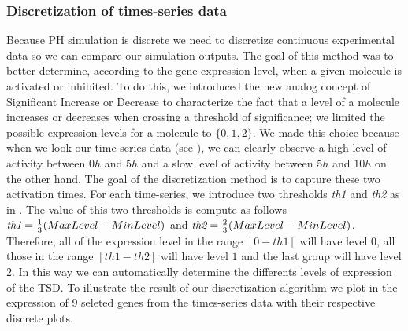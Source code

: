 \subsubsection{Discretization of times-series data}

Because PH simulation is discrete we need to discretize continuous experimental data so we can compare our simulation outputs.
The goal of this method was to better determine, according to the gene expression level, when  a given molecule is activated or inhibited.
To do this, we introduced the new analog concept of Significant Increase or Decrease to characterize the fact that a level of a molecule 
increases or decreases when crossing a threshold of significance; we limited the possible expression levels for a molecule to
$\{0, 1, 2\}$. We made this choice because when we look our time-series data (see ), we can clearly observe a high level of
activity between $0h$ and $5h$ and a slow level of activity between $5h$ and $10h$ on the other hand. The goal of the discretization method is to capture these
two activation times. For each time-series, we introduce two thresholds \emph{th1} and \emph{th2} as in . The value of this two
thresholds is compute as follows $\emph{th1}=\frac{1}{3}(MaxLevel-MinLevel)$ and $\emph{th2}=\frac{2}{3}(MaxLevel-MinLevel)$. Therefore, all
of the expression level in the range $[0-th1]$ will have level $0$, all those in the range $[th1-th2]$ will have level $1$ and the last group will
have level $2$. In  this way we can automatically determine the differents levels of expression of the TSD. 
To illustrate the result of our discretization algorithm we plot in  the expression 
of $9$ seleted genes from the times-series data with their respective discrete plots. 

